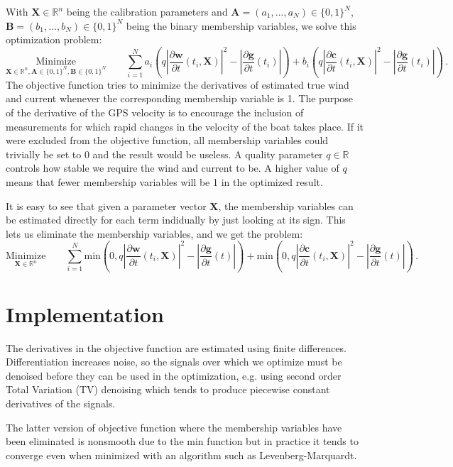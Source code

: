 \documentclass{article}
\newcommand{\minfun}{\text{min}}
\newcommand{\realvec}[1]{\mathbf{#1}}
\newcommand{\norm}[1]{\left| #1 \right|}
\newcommand{\derivative}[2]{\frac{\partial #1}{\partial #2}}
\newcommand{\timederivative}[1]{\derivative{#1}{t}}
\newcommand{\realnumber}{\mathbb{R}}
\begin{document}
With $\realvec{X} \in \realnumber^n$ being the calibration parameters and $\realvec{A} = (a_1, ..., a_N) \in \{0, 1\}^N$, $\realvec{B} = (b_1, ..., b_N) \in \{0, 1\}^N$ being the binary membership variables, we solve this optimization problem:
\begin{displaymath}
\underset{\realvec{X} \in \realnumber^n, \realvec{A} \in \{0, 1\}^N, \realvec{B} \in \{0, 1\}^N}{\text{Minimize}} \qquad \sum_{i = 1}^N  a_i\left(  q\norm{\timederivative{\realvec{w}}(t_i, \realvec{X})}^2 - \norm{\timederivative{\realvec{g}}(t_i)} \right)
+ b_i\left( q\norm{\timederivative{\realvec{c}}(t_i, \realvec{X})}^2 - \norm{\timederivative{\realvec{g}}(t_i)}\right) \, .
\end{displaymath}
The objective function tries to minimize the derivatives of estimated true wind and current whenever the corresponding membership variable is 1. The purpose of the derivative of the GPS velocity is to encourage the inclusion of measurements for which rapid changes in the velocity of the boat takes place. If it were excluded from the objective function, all membership variables could trivially be set to 0 and the result would be useless. A quality parameter $q \in \realnumber$ controls how stable we require the wind and current to be. A higher value of $q$ means that fewer membership variables will be 1 in the optimized result.

It is easy to see that given a parameter vector $\realvec{X}$, the membership variables can be estimated directly for each term indidually by just looking at its sign. This lets us eliminate the membership variables, and we get the problem:
\begin{displaymath}
\underset{\realvec{X} \in \realnumber^n}{\text{Minimize}} \qquad \sum_{i = 1}^N  \minfun\left(0, q\norm{\timederivative{\realvec{w}}(t_i, \realvec{X})}^2 - \norm{\timederivative{\realvec{g}}(t)}\right)
+ \minfun\left(0, q\norm{\timederivative{\realvec{c}}(t_i, \realvec{X})}^2 - \norm{\timederivative{\realvec{g}}(t)}\right) \, .
\end{displaymath}


\section{Implementation}
The derivatives in the objective function are estimated using finite differences. Differentiation increases noise, so the signals over which we optimize must be denoised before they can be used in the optimization, e.g. using second order Total Variation (TV) denoising which tends to produce piecewise constant derivatives of the signals.

The latter version of objective function where the membership variables have been eliminated is nonsmooth due to the $\minfun$ function but in practice it tends to converge even when minimized with an algorithm such as Levenberg-Marquardt.
\end{document}
